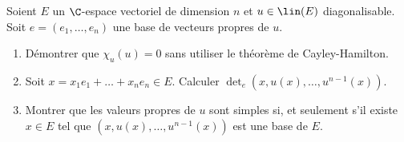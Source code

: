 \begin{enonce}
\begin{exercise}[ID={RMS125 E958, CCP MP},subtitle={2014 CCP MP},tags={}]
Soient $E$ un $\C$-espace vectoriel de dimension $n$ et $u\in\lin(E)$ diagonalisable.
Soit $e=\left( e_1,\dots,e_n \right)$ une base de vecteurs propres de $u$.
\begin{enumerate}
  \item Démontrer que $\chi_u(u)=0$ sans utiliser le théorème de Cayley-Hamilton.
  \item Soit $x=x_1e_1+\dots+x_ne_n\in E$.
    Calculer $\det_e\left( x, u(x),\dots, u^{n-1}(x) \right)$.
  \item Montrer que les valeurs propres de $u$ sont simples si, et seulement s'il existe $x\in E$
    tel que $\left( x, u(x),\dots,u^{n-1}(x) \right)$ est une base de $E$. 
\end{enumerate}
\end{exercise}
\begin{solution}
\end{solution}
\end{enonce}
